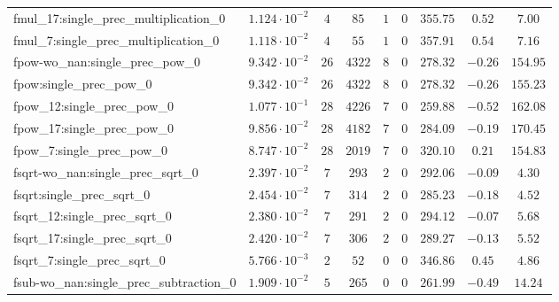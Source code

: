 \begin{tabular}{|l|c|c|c|c|c|c|c|c|}
fmul\_17:single\_prec\_multiplication\_0       & $ 1.124 \cdot 10^{-2} $ & $ 4      $ & $ 85     $ & $ 1   $ & $ 0   $ & $ 355.75      $ & $ 0.52    $ & $ 7.00    $ \\
fmul\_7:single\_prec\_multiplication\_0        & $ 1.118 \cdot 10^{-2} $ & $ 4      $ & $ 55     $ & $ 1   $ & $ 0   $ & $ 357.91      $ & $ 0.54    $ & $ 7.16    $ \\
fpow-wo\_nan:single\_prec\_pow\_0              & $ 9.342 \cdot 10^{-2} $ & $ 26     $ & $ 4322   $ & $ 8   $ & $ 0   $ & $ 278.32      $ & $ -0.26   $ & $ 154.95  $ \\
fpow:single\_prec\_pow\_0                      & $ 9.342 \cdot 10^{-2} $ & $ 26     $ & $ 4322   $ & $ 8   $ & $ 0   $ & $ 278.32      $ & $ -0.26   $ & $ 155.23  $ \\
fpow\_12:single\_prec\_pow\_0                  & $ 1.077 \cdot 10^{-1} $ & $ 28     $ & $ 4226   $ & $ 7   $ & $ 0   $ & $ 259.88      $ & $ -0.52   $ & $ 162.08  $ \\
fpow\_17:single\_prec\_pow\_0                  & $ 9.856 \cdot 10^{-2} $ & $ 28     $ & $ 4182   $ & $ 7   $ & $ 0   $ & $ 284.09      $ & $ -0.19   $ & $ 170.45  $ \\
fpow\_7:single\_prec\_pow\_0                   & $ 8.747 \cdot 10^{-2} $ & $ 28     $ & $ 2019   $ & $ 7   $ & $ 0   $ & $ 320.10      $ & $ 0.21    $ & $ 154.83  $ \\
fsqrt-wo\_nan:single\_prec\_sqrt\_0            & $ 2.397 \cdot 10^{-2} $ & $ 7      $ & $ 293    $ & $ 2   $ & $ 0   $ & $ 292.06      $ & $ -0.09   $ & $ 4.30    $ \\
fsqrt:single\_prec\_sqrt\_0                    & $ 2.454 \cdot 10^{-2} $ & $ 7      $ & $ 314    $ & $ 2   $ & $ 0   $ & $ 285.23      $ & $ -0.18   $ & $ 4.52    $ \\
fsqrt\_12:single\_prec\_sqrt\_0                & $ 2.380 \cdot 10^{-2} $ & $ 7      $ & $ 291    $ & $ 2   $ & $ 0   $ & $ 294.12      $ & $ -0.07   $ & $ 5.68    $ \\
fsqrt\_17:single\_prec\_sqrt\_0                & $ 2.420 \cdot 10^{-2} $ & $ 7      $ & $ 306    $ & $ 2   $ & $ 0   $ & $ 289.27      $ & $ -0.13   $ & $ 5.52    $ \\
fsqrt\_7:single\_prec\_sqrt\_0                 & $ 5.766 \cdot 10^{-3} $ & $ 2      $ & $ 52     $ & $ 0   $ & $ 0   $ & $ 346.86      $ & $ 0.45    $ & $ 4.86    $ \\
fsub-wo\_nan:single\_prec\_subtraction\_0      & $ 1.909 \cdot 10^{-2} $ & $ 5      $ & $ 265    $ & $ 0   $ & $ 0   $ & $ 261.99      $ & $ -0.49   $ & $ 14.24   $ \\

\end{tabular}
